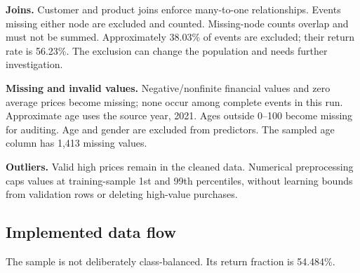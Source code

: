 \documentclass[11pt,a4paper]{article}
\begin{document}
\textbf{Joins.} Customer and product joins enforce many-to-one relationships. Events missing either node are excluded and counted. Missing-node counts overlap and must not be summed. Approximately 38.03\% of events are excluded; their return rate is 56.23\%. The exclusion can change the population and needs further investigation.

\textbf{Missing and invalid values.} Negative/nonfinite financial values and zero average prices become missing; none occur among complete events in this run. Approximate age uses the source year, 2021. Ages outside 0--100 become missing for auditing. Age and gender are excluded from predictors. The sampled age column has 1,413 missing values.

\textbf{Outliers.} Valid high prices remain in the cleaned data. Numerical preprocessing caps values at training-sample 1st and 99th percentiles, without learning bounds from validation rows or deleting high-value purchases.
\subsection*{Implemented data flow}
\begin{center}\end{center}
The sample is not deliberately class-balanced. Its return fraction is 54.484\%.

\newpage
\end{document}
